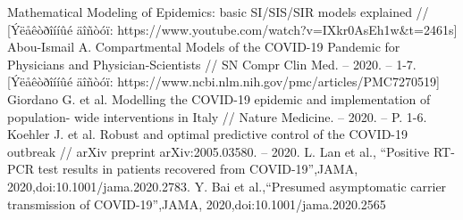 \begin{biblio}
Mathematical Modeling of Epidemics: basic SI/SIS/SIR models explained // [Ýëåêòðîííûé äîñòóï: https://www.youtube.com/watch?v=IXkr0AsEh1w\&t=2461s]
 Abou-Ismail A. Compartmental Models of the COVID-19 Pandemic for Physicians and
Physician-Scientists  //  SN  Compr  Clin  Med.  –  2020.  –  1-7.  [Ýëåêòðîííûé  äîñòóï:
https://www.ncbi.nlm.nih.gov/pmc/articles/PMC7270519]
 Giordano G. et al. Modelling the COVID-19 epidemic and implementation of population-
wide interventions in Italy // Nature Medicine. – 2020. – P. 1-6.
 Koehler  J.  et  al.  Robust  and  optimal  predictive  control  of  the  COVID-19  outbreak  //
arXiv preprint arXiv:2005.03580. – 2020. 
 L.  Lan  et  al.,   “Positive  RT-PCR  test  results  in  patients  recovered  from  COVID-19”,JAMA,  2020,doi:10.1001/jama.2020.2783.
 Y.    Bai    et    al.,“Presumed    asymptomatic    carrier    transmission    of    COVID-19”,JAMA,    2020,doi:10.1001/jama.2020.2565
\end{biblio}

